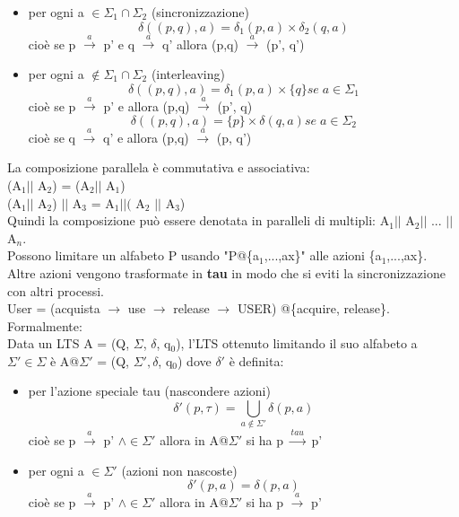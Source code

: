 \documentclass[12pt]{article}
\begin{document}
\begin{itemize}
    \item per ogni a $\in \Sigma_1 \cap \Sigma_2$ (sincronizzazione)
        \[
            \delta((p,q),a) = \delta_1(p,a) \times \delta_2(q,a)
        \]
        cioè se  p $\overset{a}{\rightarrow}$ p' e q $\overset{a}{\rightarrow}$ q' allora (p,q) $\overset{a}{\rightarrow}$ (p', q')
    \item per ogni a $\notin \Sigma_1 \cap \Sigma_2$ (interleaving)
        \[
            \delta((p,q),a) = \delta_1(p,a) \times \{q\} se \; a \in \Sigma_1
        \]
        cioè se  p $\overset{a}{\rightarrow}$ p' e  allora (p,q) $\overset{a}{\rightarrow}$ (p', q)
        \[
            \delta((p,q),a) = \{p\} \times \delta(q,a)   se \; a \in \Sigma_2
        \]
        cioè se  q $\overset{a}{\rightarrow}$ q' e  allora (p,q) $\overset{a}{\rightarrow}$ (p, q')
\end{itemize}
La composizione parallela è commutativa e associativa:
\\ (A$_1 ||$ A$_2$) = (A$_2 ||$ A$_1$) 
\\ (A$_1 ||$ A$_2$) $||$ A$_3$ = A$_1 ||($ A$_2$ $||$ A$_3$)
\\ Quindi la composizione può essere denotata in paralleli di multipli: A$_1 ||$ A$_2 ||$ ... $||$ A$_n$.
\\ Possono limitare un alfabeto P usando "P@\{a$_1$,...,ax\}" alle azioni \{a$_1$,...,ax\}. Altre azioni vengono trasformate in \textbf{tau} in modo che si eviti la sincronizzazione con altri processi. 
\\ User = (acquista $\rightarrow$ use $\rightarrow$ release $\rightarrow$ USER) @\{acquire, release\}.
\\ Formalmente: 
\\ Data un LTS A = (Q, $\Sigma$, $\delta$, q$_0$), l'LTS ottenuto limitando il suo alfabeto a $\Sigma' \in \Sigma$ è A@$\Sigma'$ = (Q, $\Sigma', \delta$, q$_0$) dove $\delta'$ è definita: 
\begin{itemize}
    \item per l'azione speciale tau (nascondere azioni) 
        \[ 
            \delta'(p,\tau) = \bigcup_{a \notin \Sigma'}\delta(p,a)
        \]
        cioè se p $\overset{a}{\rightarrow}$ p' $\land \in \Sigma'$ allora in A@$\Sigma'$ si ha p $\overset{tau}{\rightarrow}$ p'
    \item per ogni a $\in \Sigma'$ (azioni non nascoste) 
        \[
            \delta'(p,a) = \delta(p,a)
        \]
        cioè se p $\overset{a}{\rightarrow}$ p' $\land \in \Sigma'$ allora in A@$\Sigma'$ si ha p $\overset{a}{\rightarrow}$ p'
\end{itemize}
\end{document}

